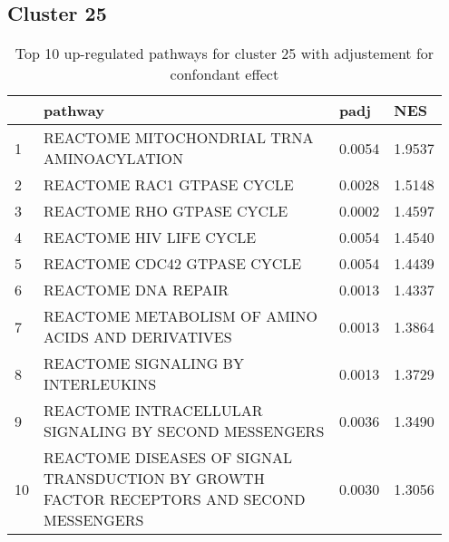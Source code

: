 \documentclass{article}
\begin{document}
\subsection{Cluster 25 }
\begin{table}[H]
\centering
\begin{tabular}{p{0.05\linewidth}p{0.7\linewidth}p{0.1\linewidth}p{0.1\linewidth}}
  \hline
 & pathway & padj & NES \\ 
  \hline
1 & REACTOME MITOCHONDRIAL TRNA AMINOACYLATION & 0.0054 & 1.9537 \\ 
  2 & REACTOME RAC1 GTPASE CYCLE & 0.0028 & 1.5148 \\ 
  3 & REACTOME RHO GTPASE CYCLE & 0.0002 & 1.4597 \\ 
  4 & REACTOME HIV LIFE CYCLE & 0.0054 & 1.4540 \\ 
  5 & REACTOME CDC42 GTPASE CYCLE & 0.0054 & 1.4439 \\ 
  6 & REACTOME DNA REPAIR & 0.0013 & 1.4337 \\ 
  7 & REACTOME METABOLISM OF AMINO ACIDS AND DERIVATIVES & 0.0013 & 1.3864 \\ 
  8 & REACTOME SIGNALING BY INTERLEUKINS & 0.0013 & 1.3729 \\ 
  9 & REACTOME INTRACELLULAR SIGNALING BY SECOND MESSENGERS & 0.0036 & 1.3490 \\ 
  10 & REACTOME DISEASES OF SIGNAL TRANSDUCTION BY GROWTH FACTOR RECEPTORS AND SECOND MESSENGERS & 0.0030 & 1.3056 \\ 
   \hline
\end{tabular}
\caption{Top 10 up-regulated pathways for cluster 25 with adjustement for confondant effect} 
\label{tab:q3_2_conf_25}
\end{table}
\end{document}
